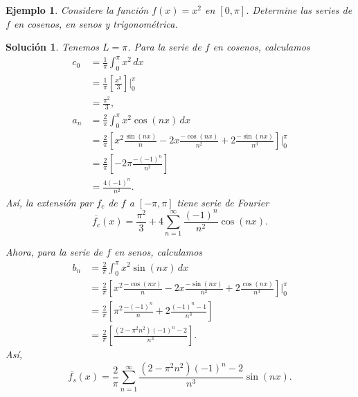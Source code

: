 \documentclass[11pt,letterpaper,draft]{report}
\newtheorem{example}[defn]{Ejemplo}
\newtheorem*{sol}{Solución}
\newcommand\<{\langle}
\renewcommand\>{\rangle}
\begin{document}
\begin{example}
  Considere la función $f(x)=x^{2}$ en $[0,\pi]$. Determine las
  series de $f$ en cosenos, en senos y trigonométrica.
\end{example}
\begin{sol}
  Tenemos $L=\pi$. Para la serie de $f$ en cosenos, calculamos
  \begin{align*}
    c_0
    &= \frac{1}{\pi}\int_{0}^{\pi}x^{2}\,dx \\
    &= \frac{1}{\pi} \left[
      \frac{x^{3}}{3}
    \right]\Big|_{0}^{\pi} \\
    &= \frac{\pi^{2}}{3}, \\
    a_n
    &= \frac{2}{\pi}\int_{0}^{\pi}x^{2}\cos(nx)\,dx \\
    &= \frac{2}{\pi} \left[
      x^{2}\frac{\sin(nx)}{n}
      -2x\frac{-\cos(nx)}{n^{2}}
      +2\frac{-\sin(nx)}{n^{3}}
    \right]\Big|_{0}^{\pi} \\
    &= \frac{2}{\pi} \left[
      -2\pi\frac{-(-1)^{n}}{n^{2}}
    \right] \\
    &= \frac{4(-1)^{n}}{n^{2}}.
  \end{align*}
  Así, la extensión par $f_c$ de $f$ a $[-\pi,\pi]$ tiene serie de
  Fourier
  \[
    \overline{f_c}(x)
    =
    \frac{\pi^{2}}{3}
    +
    4\sum_{n=1}^{\infty}\frac{(-1)^{n}}{n^{2}}\cos(nx)
  .\]
  
  Ahora, para la serie de $f$ en senos, calculamos
  \begin{align*}
    b_n
    &= \frac{2}{\pi}\int_{0}^{\pi}x^{2}\sin(nx)\,dx \\
    &= \frac{2}{\pi} \left[
      x^{2}\frac{-\cos(nx)}{n}
      -2x\frac{-\sin(nx)}{n^{2}}
      +2\frac{\cos(nx)}{n^{3}}
    \right]\Big|_{0}^{\pi} \\
    &= \frac{2}{\pi} \left[
      \pi^{2}\frac{-(-1)^{n}}{n}+2\frac{(-1)^{n}-1}{n^{3}}
    \right] \\
    &= \frac{2}{\pi} \left[
      \frac{(2-\pi^{2}n^{2})(-1)^{n}-2}{n^{3}}
    \right].
  \end{align*}
  Así,
  \[
    \overline{f_s}(x)
    =
    \frac{2}{\pi}\sum_{n=1}^{\infty}
      \frac{(2-\pi^{2}n^{2})(-1)^{n}-2}{n^{3}}
      \sin(nx)
  .\]
  

\end{sol}
\end{document}
